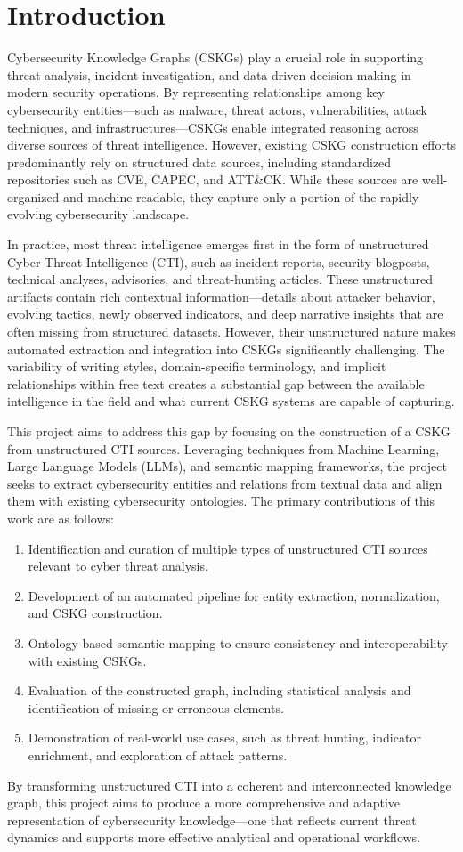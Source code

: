 \section{Introduction}

Cybersecurity Knowledge Graphs (CSKGs) play a crucial role in supporting threat analysis, incident investigation, and data-driven decision-making in modern security operations. By representing relationships among key cybersecurity entities—such as malware, threat actors, vulnerabilities, attack techniques, and infrastructures—CSKGs enable integrated reasoning across diverse sources of threat intelligence. However, existing CSKG construction efforts predominantly rely on structured data sources, including standardized repositories such as CVE, CAPEC, and ATT\&CK. While these sources are well-organized and machine-readable, they capture only a portion of the rapidly evolving cybersecurity landscape.

In practice, most threat intelligence emerges first in the form of unstructured Cyber Threat Intelligence (CTI), such as incident reports, security blogposts, technical analyses, advisories, and threat-hunting articles. These unstructured artifacts contain rich contextual information—details about attacker behavior, evolving tactics, newly observed indicators, and deep narrative insights that are often missing from structured datasets. However, their unstructured nature makes automated extraction and integration into CSKGs significantly challenging. The variability of writing styles, domain-specific terminology, and implicit relationships within free text creates a substantial gap between the available intelligence in the field and what current CSKG systems are capable of capturing.

This project aims to address this gap by focusing on the construction of a CSKG from unstructured CTI sources. Leveraging techniques from Machine Learning, Large Language Models (LLMs), and semantic mapping frameworks, the project seeks to extract cybersecurity entities and relations from textual data and align them with existing cybersecurity ontologies. The primary contributions of this work are as follows:

\begin{enumerate}
    \item Identification and curation of multiple types of unstructured CTI sources relevant to cyber threat analysis.
    \item Development of an automated pipeline for entity extraction, normalization, and CSKG construction.
    \item Ontology-based semantic mapping to ensure consistency and interoperability with existing CSKGs.
    \item Evaluation of the constructed graph, including statistical analysis and identification of missing or erroneous elements.
    \item Demonstration of real-world use cases, such as threat hunting, indicator enrichment, and exploration of attack patterns.
\end{enumerate}

By transforming unstructured CTI into a coherent and interconnected knowledge graph, this project aims to produce a more comprehensive and adaptive representation of cybersecurity knowledge—one that reflects current threat dynamics and supports more effective analytical and operational workflows.

